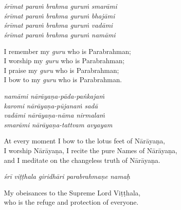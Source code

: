 \chapter{}

\thispagestyle{empty} %

\vspace*{1cm} %

\begin{center}
    {\large\itshape
    śrīmat paraṁ brahma guruṁ smarāmi \\
    śrīmat paraṁ brahma guruṁ bhajāmi \\
    śrīmat paraṁ brahma guruṁ vadāmi \\
    śrīmat paraṁ brahma guruṁ namāmi \par
    }

    \vspace{1em}

    \small
    I remember my \textit{guru} who is Parabrahman; \\
    I worship my \textit{guru} who is Parabrahman; \\
    I praise my \textit{guru} who is Parabrahman; \\
    I bow to my \textit{guru} who is Parabrahman.

    \vspace{2em}

    {\large\itshape
    namāmi nārāyaṇa-pāda-paṅkajaṁ \\
    karomi nārāyaṇa-pūjanaṁ sadā \\
    vadāmi nārāyaṇa-nāma nirmalaṁ \\
    smarāmi nārāyaṇa-tattvam avyayam \par
    }

    \vspace{1em}

    \small
    At every moment I bow to the lotus feet of Nārāyaṇa, \\
    I worship Nārāyaṇa, I recite the pure Names of Nārāyaṇa, \\
    and I meditate on the changeless truth of Nārāyaṇa.

    \vspace{2.5em}

    {\large\itshape
    śrī viṭṭhala giridhāri parabrahmaṇe namaḥ \par
    }

    \vspace{1em}

    \small
    My obeisances to the Supreme Lord Viṭṭhala, \\
    who is the refuge and protection of everyone.
\end{center}

\newpage